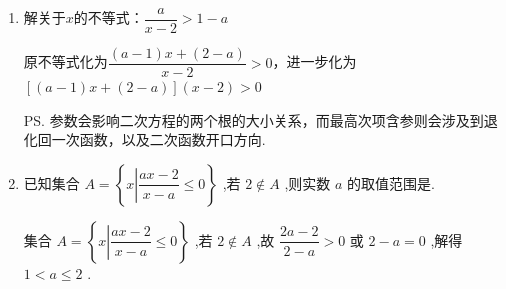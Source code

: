 \begin{enumerate}
\begin{jieda}
        结合高次不等式奇穿偶不穿的性质求解不等式组可得原不等式的解集为: $(- \infty , - 3 \rbrack  \cup  \{  - 1\}  \cup  (1,2\rbrack$
    \end{jieda} 
    \item 解关于$x$的不等式：$\dfrac{a}{x-2} > 1-a$
    \begin{jieda}
        原不等式化为$\dfrac{(a-1)x+(2-a)}{x-2} > 0$，进一步化为$[(a-1)x+(2-a)](x-2) > 0$ 
        \ps 参数会影响二次方程的两个根的大小关系，而最高次项含参则会涉及到退化回一次函数，以及二次函数开口方向.
    \end{jieda}

    \item 已知集合 $A = \left\{  {x\left| {\dfrac{{ax} - 2}{x - a} \leq  0}\right. }\right\}$ ,若 $2 \notin  A$ ,则实数 $a$ 的取值范围是.
    \begin{jieda}
        集合 $A = \left\{  {x\left| {\dfrac{{ax} - 2}{x - a} \leq  0}\right. }\right\}$ ,若 $2 \notin  A$ ,故 $\dfrac{{2a} - 2}{2 - a} > 0$ 或 $2 - a = 0$ ,解得 $1 < a \leq  2$ .
    \end{jieda}
\end{enumerate}

